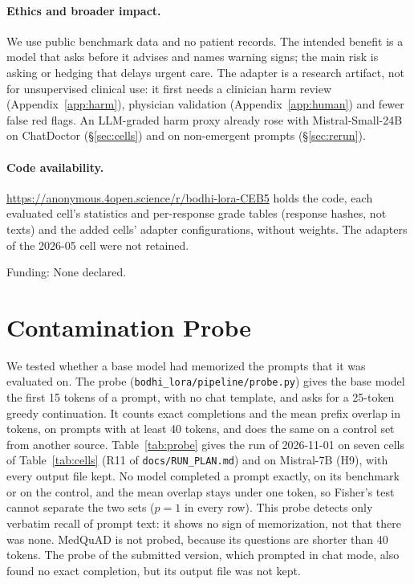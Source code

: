 \documentclass{article}
\newcommand{\codeurl}{\url{https://anonymous.4open.science/r/bodhi-lora-CEB5}}
\begin{document}
\paragraph{Ethics and broader impact.} We use public benchmark data and no patient records. The
intended benefit is a model that asks before it advises and names warning signs; the main risk is
asking or hedging that delays urgent care. The adapter is a research artifact, not for unsupervised
clinical use: it first needs a clinician harm review (Appendix~\ref{app:harm}), physician validation
(Appendix~\ref{app:human}) and fewer false red flags. An LLM-graded harm proxy already rose with
Mistral-Small-24B on ChatDoctor (\S\ref{sec:cells}) and on non-emergent prompts (\S\ref{sec:rerun}).

\paragraph{Code availability.} \codeurl{} holds the code, each evaluated cell's statistics and
per-response grade tables (response hashes, not texts) and the added cells' adapter configurations,
without weights. The adapters of the 2026-05 cell were not retained.

\begin{ack}
Funding: None declared.
\end{ack}




\newpage
\appendix

\section{Contamination Probe}
\label{app:contamination}

We tested whether a base model had memorized the prompts that it was evaluated on. The probe
(\texttt{bodhi\_lora/pipeline/probe.py}) gives the base model the first 15 tokens of a prompt, with no
chat template, and asks for a 25-token greedy continuation. It counts exact completions and the mean prefix overlap in
tokens, on prompts with at least 40 tokens, and does the same on a control set from another source.
Table~\ref{tab:probe} gives the run of 2026-11-01 on seven cells of Table~\ref{tab:cells} (R11 of
\texttt{docs/RUN\_PLAN.md}) and on Mistral-7B (H9), with every output file kept. No model completed a
prompt exactly, on its benchmark or on the control, and the mean overlap stays under one token, so
Fisher's test cannot separate the two sets ($p = 1$ in every row). This probe detects only verbatim
recall of prompt text: it shows no sign of memorization, not that there was none. MedQuAD is not
probed, because its questions are shorter than 40 tokens. The probe of the submitted version, which
prompted in chat mode, also found no exact completion, but its output file was not kept.
\end{document}
